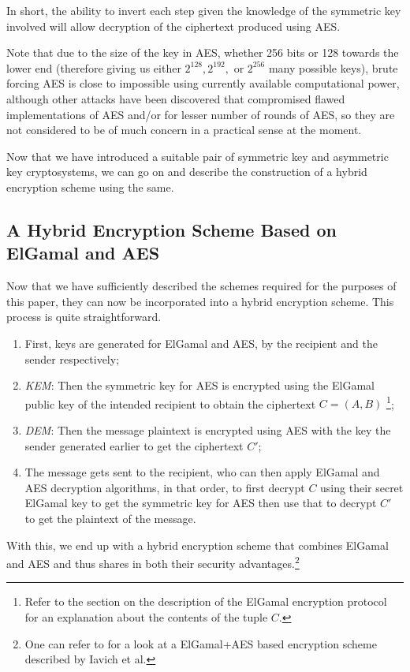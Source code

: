 In short, the ability to invert each step given the knowledge of the symmetric key involved will allow decryption of the ciphertext produced using AES.

Note that due to the size of the key in AES, whether 256 bits or 128 towards the lower end (therefore giving us either $2^{128}, 2^{192},$ or $2^{256}$ many possible keys), brute forcing AES is close to impossible using currently available computational power, although other attacks have been discovered that compromised flawed implementations of AES and/or for lesser number of rounds of AES, so they are not considered to be of much concern in a practical sense at the moment.

Now that we have introduced a suitable pair of symmetric key and asymmetric key cryptosystems, we can go on and describe the construction of a hybrid encryption scheme using the same.

\subsection{A Hybrid Encryption Scheme Based on ElGamal and AES}

Now that we have sufficiently described the schemes required for the purposes of this paper, they can now be incorporated into a hybrid encryption scheme. 
This process is quite straightforward.

\begin{enumerate}
    \setlength\itemsep{1em}
    \item First, keys are generated for ElGamal and AES, by the recipient and the sender respectively;
    \item\emph{KEM}: Then the symmetric key for AES  is encrypted using the ElGamal public key of the intended recipient to obtain the ciphertext $C=(A,B)$\textsuperscript{   }\footnote{Refer to the section on the description of the ElGamal encryption protocol for an explanation about the contents of the tuple $C$.};
    \item\emph{DEM}: Then the message plaintext is encrypted using AES with the key the sender generated earlier to get the ciphertext $C'$;
    \item The message gets sent to the recipient, who can then apply ElGamal and AES decryption algorithms, in that order, to first decrypt $C$ using their secret ElGamal key to get the symmetric key for AES then use that to decrypt $C'$ to get the plaintext of the message.
\end{enumerate}

With this, we end up with a hybrid encryption scheme that combines ElGamal and AES and thus shares in both their security advantages.\footnote{One can refer to \cite{Iavich_Gnatyuk_Jintcharadze_Polishchuk_Odarchenko_2018} for a look at a ElGamal+AES based encryption scheme described by Iavich et al.}

